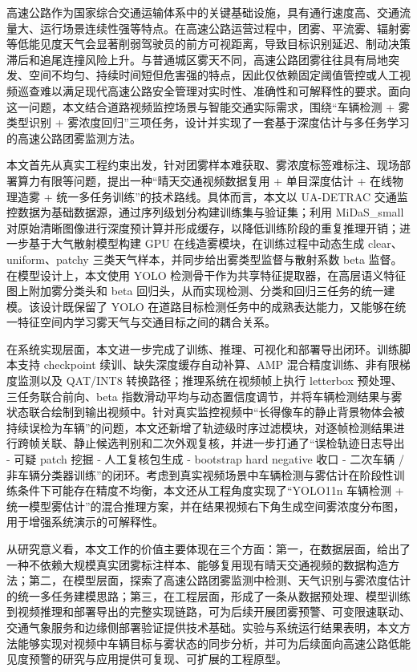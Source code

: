 高速公路作为国家综合交通运输体系中的关键基础设施，具有通行速度高、交通流量大、运行场景连续性强等特点。在高速公路运营过程中，团雾、平流雾、辐射雾等低能见度天气会显著削弱驾驶员的前方可视距离，导致目标识别延迟、制动决策滞后和追尾连撞风险上升。与普通城区雾天不同，高速公路团雾往往具有局地突发、空间不均匀、持续时间短但危害强的特点，因此仅依赖固定阈值管控或人工视频巡查难以满足现代高速公路安全管理对实时性、准确性和可解释性的要求。面向这一问题，本文结合道路视频监控场景与智能交通实际需求，围绕“车辆检测 + 雾类型识别 + 雾浓度回归”三项任务，设计并实现了一套基于深度估计与多任务学习的高速公路团雾监测方法。

本文首先从真实工程约束出发，针对团雾样本难获取、雾浓度标签难标注、现场部署算力有限等问题，提出一种“晴天交通视频数据复用 + 单目深度估计 + 在线物理造雾 + 统一多任务训练”的技术路线。具体而言，本文以 UA-DETRAC 交通监控数据为基础数据源，通过序列级划分构建训练集与验证集；利用 MiDaS\_small 对原始清晰图像进行深度预计算并形成缓存，以降低训练阶段的重复推理开销；进一步基于大气散射模型构建 GPU 在线造雾模块，在训练过程中动态生成 clear、uniform、patchy 三类天气样本，并同步给出雾类型监督与散射系数 beta 监督。在模型设计上，本文使用 YOLO 检测骨干作为共享特征提取器，在高层语义特征图上附加雾分类头和 beta 回归头，从而实现检测、分类和回归三任务的统一建模。该设计既保留了 YOLO 在道路目标检测任务中的成熟表达能力，又能够在统一特征空间内学习雾天气与交通目标之间的耦合关系。

在系统实现层面，本文进一步完成了训练、推理、可视化和部署导出闭环。训练脚本支持 checkpoint 续训、缺失深度缓存自动补算、AMP 混合精度训练、非有限梯度监测以及 QAT/INT8 转换路径；推理系统在视频帧上执行 letterbox 预处理、三任务联合前向、beta 指数滑动平均与动态置信度调节，并将车辆检测结果与雾状态联合绘制到输出视频中。针对真实监控视频中“长得像车的静止背景物体会被持续误检为车辆”的问题，本文还新增了轨迹级时序过滤模块，对逐帧检测结果进行跨帧关联、静止候选判别和二次外观复核，并进一步打通了“误检轨迹日志导出 - 可疑 patch 挖掘 - 人工复核包生成 - bootstrap hard negative 收口 - 二次车辆 / 非车辆分类器训练”的闭环。考虑到真实视频场景中车辆检测与雾估计在阶段性训练条件下可能存在精度不均衡，本文还从工程角度实现了“YOLO11n 车辆检测 + 统一模型雾估计”的混合推理方案，并在结果视频右下角生成空间雾浓度分布图，用于增强系统演示的可解释性。

从研究意义看，本文工作的价值主要体现在三个方面：第一，在数据层面，给出了一种不依赖大规模真实团雾标注样本、能够复用现有晴天交通视频的数据构造方法；第二，在模型层面，探索了高速公路团雾监测中检测、天气识别与雾浓度估计的统一多任务建模思路；第三，在工程层面，形成了一条从数据预处理、模型训练到视频推理和部署导出的完整实现链路，可为后续开展团雾预警、可变限速联动、交通气象服务和边缘侧部署验证提供技术基础。实验与系统运行结果表明，本文方法能够实现对视频中车辆目标与雾状态的同步分析，并可为后续面向高速公路低能见度预警的研究与应用提供可复现、可扩展的工程原型。
